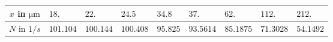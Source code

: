 \begin{tabular}{c|*{8}{*{1}{l}}}
$x$ in $\si{\micro\meter}$ & $18.$ & $22.$ & $24.5$ & $34.8$ & $37.$ & $62.$ & $112.$ & $212.$ \\ \hline
$N$ in $\si{1/s}$ & $101.104$ & $100.144$ & $100.408$ & $95.825$ & $93.5614$ & $85.1875$ & $71.3028$ & $54.1492$\end{tabular}
